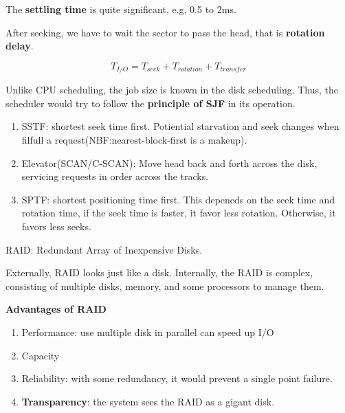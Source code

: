         The \textbf{settling time} is quite significant, e.g, 0.5 to 2ms.

        After seeking, we have to wait the sector to pass the head, that is \textbf{rotation delay}.
    

        \begin{equation*}
            T_{I/O} = T_{seek} + T_{rotation} + T_{transfer}
        \end{equation*}


        Unlike CPU scheduling, the job size is known in the disk scheduling. Thus, 
        the scheduler would try to follow the \textbf{principle of SJF} in its operation.

        \begin{enumerate}
            \item SSTF: shortest seek time first. 
            Potiential starvation and seek changes when filfull a request(NBF:nearest-block-first is a makeup).
            \item Elevator(SCAN/C-SCAN): Move head back and forth across the disk, servicing requests 
            in order across the tracks.
            \item SPTF: shortest positioning time first. This depeneds on the seek time and rotation time,
            if the seek time is faster, it favor less rotation. Otherwise, it favors less seeks.
        \end{enumerate}



        RAID: Redundant Array of Inexpensive Disks.

        Externally, RAID looks just like a disk. Internally, the RAID 
        is complex, consisting of multiple disks, memory, and some processors
        to manage them.

        \textbf{Advantages of RAID}
        \begin{enumerate}
            \item Performance: use multiple disk in parallel can speed up I/O
            \item Capacity
            \item Reliability:  with some redundancy, it would prevent a single point 
            failure.
            \item \textbf{Transparency}: the system sees the RAID as a gigant disk.
        \end{enumerate}


